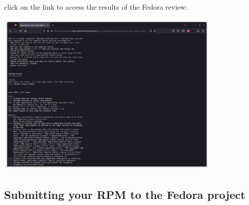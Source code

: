click on the link to access the results of the Fedora review:
\begin{center}
\includegraphics[width=0.8\textwidth,keepaspectratio=true,draft=\ddst]{img/rpms/copr-package-review.eps}
\end{center}


\subsection{Submitting your RPM to the Fedora project}

